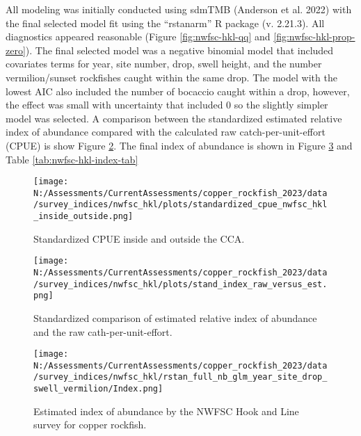 \documentclass[11pt,
  english,
  letterpaper,
]{article}
\begin{document}
All modeling was initially conducted using sdmTMB (Anderson et al. 2022) with the final selected model fit using the ``rstanarm'' R package (v. 2.21.3). All diagnostics appeared reasonable (Figure \ref{fig:nwfsc-hkl-qq} and \ref{fig:nwfsc-hkl-prop-zero}). The final selected model was a negative binomial model that included covariates terms for year, site number, drop, swell height, and the number vermilion/sunset rockfishes caught within the same drop. The model with the lowest AIC also included the number of bocaccio caught within a drop, however, the effect was small with uncertainty that included 0 so the slightly simpler model was selected. A comparison between the standardized estimated relative index of abundance compared with the calculated raw catch-per-unit-effort (CPUE) is show Figure \ref{fig:nwfsc-hkl-index-raw}. The final index of abundance is shown in Figure \ref{fig:nwfsc-hkl-index} and Table \ref{tab:nwfsc-hkl-index-tab}

\pagebreak



\newpage



\newpage

\begin{figure}
\centering
\texttt{[image: N:/Assessments/CurrentAssessments/copper\_rockfish\_2023/data/survey\_indices/nwfsc\_hkl/plots/standardized\_cpue\_nwfsc\_hkl\_inside\_outside.png]}
\caption{Standardized CPUE inside and outside the CCA.\label{fig:nwfsc-hkl-cca}}
\end{figure}

\newpage

\begin{figure}
\centering
\texttt{[image: N:/Assessments/CurrentAssessments/copper\_rockfish\_2023/data/survey\_indices/nwfsc\_hkl/plots/stand\_index\_raw\_versus\_est.png]}
\caption{Standardized comparison of estimated relative index of abundance and the raw cath-per-unit-effort.\label{fig:nwfsc-hkl-index-raw}}
\end{figure}

\newpage

\begin{figure}
\centering
\texttt{[image: N:/Assessments/CurrentAssessments/copper\_rockfish\_2023/data/survey\_indices/nwfsc\_hkl/rstan\_full\_nb\_glm\_year\_site\_drop\_swell\_vermilion/Index.png]}
\caption{Estimated index of abundance by the NWFSC Hook and Line survey for copper rockfish.\label{fig:nwfsc-hkl-index}}
\end{figure}
\end{document}
